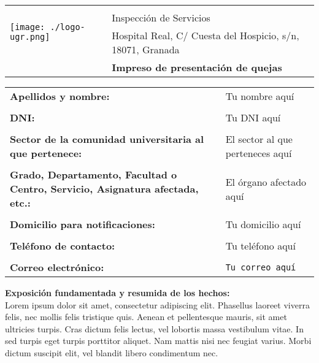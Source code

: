 \documentclass{article}
\begin{document}
\begin{table}[]
\centering
\begin{tabular}{@{}m{8cm}l}
    \multirow{3}{*}{\texttt{[image: ./logo-ugr.png]}}
    & \\[2ex]
    & Inspección de Servicios\\[1.25ex]
    & Hospital Real, C/ Cuesta del Hospicio, s/n, 18071, Granada\\[1.25ex]
    & \Large{\textbf{Impreso de presentación de quejas}}\\[1.25ex]
\end{tabular}
\end{table}

\begin{tabular}{@{}p{7cm}>{\raggedright\arraybackslash}p{9cm}@{}}
    \textbf{Apellidos y nombre:} & Tu nombre aquí\\
    \\[-1em]
    \textbf{DNI:} & Tu DNI aquí\\
    \\[-1em]
    \textbf{Sector de la comunidad universitaria al que pertenece:} & El sector al que perteneces aquí\\
    \\[-1em]
    \textbf{Grado, Departamento, Facultad o Centro, Servicio, Asignatura afectada, etc.:} & El órgano afectado aquí\\
    \\[-1em]
    \textbf{Domicilio para notificaciones:} & Tu domicilio aquí\\
    \\[-1em]
    \textbf{Teléfono de contacto:} & Tu teléfono aquí\\
    \\[-1em]
    \textbf{Correo electrónico:} & \texttt{Tu correo aquí}
\end{tabular}

\vspace{1cm}
\textbf{Exposición fundamentada y resumida de los hechos:}\\

Lorem ipsum dolor sit amet, consectetur adipiscing elit. Phasellus laoreet viverra felis, nec mollis felis tristique quis. Aenean et pellentesque mauris, sit amet ultricies turpis. Cras dictum felis lectus, vel lobortis massa vestibulum vitae. In sed turpis eget turpis porttitor aliquet. Nam mattis nisi nec feugiat varius. Morbi dictum suscipit elit, vel blandit libero condimentum nec.\\
\end{document}
